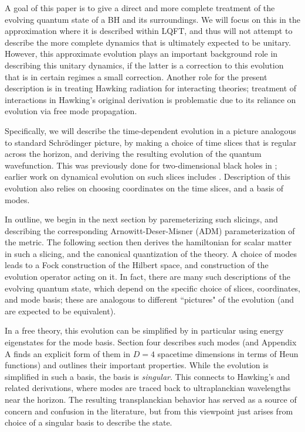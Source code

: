 \documentclass[11pt]{article}
\numberwithin{equation}{section}
\begin{document}
A goal of this paper is to give a direct and more complete treatment of the evolving quantum state of a BH and its surroundings.  We will focus on this in the approximation where it is described within LQFT, and thus will not attempt to describe the more complete dynamics that is ultimately expected to be unitary.  However, this approximate evolution plays an important background role in describing this unitary dynamics, if the latter is a correction to this evolution that is in certain regimes a small correction.  Another role for the present description is in treating Hawking radiation for interacting theories; treatment of interactions in Hawking's original derivation is problematic due to its reliance on evolution via free mode propagation.

Specifically, we will describe the time-dependent evolution in a picture analogous to standard Schr\"odinger picture, by making a choice of time slices that is regular across the horizon, and deriving the resulting evolution of the quantum wavefunction.  This was previously done for two-dimensional black holes in \cite{SEHS,SE2d}; earlier work on dynamical evolution on such slices includes \cite{MeWe1,MeWe2,BHS,HoSi}.  
  Description of this evolution also relies on choosing coordinates on the time slices, and a basis of modes.

In outline, we begin in the next section by paremeterizing such slicings, and describing the corresponding Arnowitt-Deser-Misner (ADM)  parameterization of the metric.  The following section then derives the hamiltonian for scalar matter in such a slicing, and the canonical quantization of the theory.  A choice of modes  leads to a Fock construction of the Hilbert space, and construction of the evolution operator acting on it.   In fact, there are many such descriptions of the evolving quantum state, which depend on the specific choice of slices, coordinates, and mode basis; these are analogous to different ``pictures" of the evolution (and are expected to be equivalent).  

In a free theory, this evolution can be simplified by in particular using energy eigenstates for the mode basis.  Section four describes such modes (and Appendix A finds an explicit form of them in $D=4$ spacetime dimensions in terms of Heun functions) and outlines their important properties.  While the evolution is simplified in such a basis, the basis is {\it singular}.  This connects to Hawking's and related derivations, where modes are traced back to ultraplanckian wavelengths near the horizon.  The resulting transplanckian behavior has served as a source of concern and confusion in the literature, but from this viewpoint just arises from choice of  a singular basis to describe the state.
\end{document}
